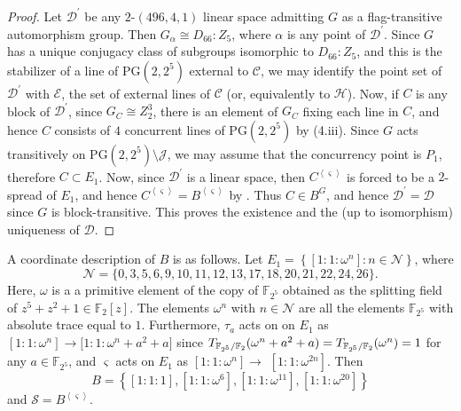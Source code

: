\documentclass[a4paper,twopage,reqno,12pt]{amsart}
\theoremstyle{definition}
\numberwithin{equation}{section}
\newcommand{\PG}{\mathrm{PG}}
\begin{document}
\begin{proof}
Let $\mathcal{D}^{\prime}$ be any $2$-$(496,4,1)$ linear space admitting $G$ as a flag-transitive automorphism group. Then $G_{\alpha} \cong D_{66}:Z_{5}$, where $\alpha$ is any point of $\mathcal{D}^{\prime}$. Since $G$ has a unique conjugacy class of subgroups isomorphic to $D_{66}:Z_{5}$, and this is the stabilizer of a line of $\PG(2,2^{5})$ external to $\mathcal{C}$, we may identify the point set of $\mathcal{D}^{\prime}$ with $\mathcal{E}$, the set of external lines of $\mathcal{C}$ (or, equivalently to $\mathcal{H}$). Now, if $C$ is any block of $\mathcal{D}^{\prime}$, since $G_{C}\cong Z^{3}_{2}$, there is an element of $G_{C}$ fixing each line in $C$, and hence $C$ consists of $4$ concurrent lines of $\PG(2,2^{5})$ by (4.iii). Since $G$ acts transitively on $\PG(2,2^{5})\setminus \mathcal{J}$, we may assume that the concurrency point is $P_{1}$, therefore $C \subset E_{1}$. Now, since $\mathcal{D}^{\prime}$ is a linear space, then $C^{\left\langle \varsigma \right\rangle}$ is forced to be a $2$-spread of $E_{1}$, and hence $C^{\left\langle \varsigma \right\rangle}=B^{\left\langle \varsigma \right\rangle}$ by \cite[Lemma 2.1]{Dru}. Thus $C \in B^{G}$, and hence $\mathcal{D}^{\prime}=\mathcal{D}$ since $G$ is block-transitive. This proves the existence and the (up to isomorphism) uniqueness of $\mathcal{D}$.
\end{proof}

\bigskip

A coordinate description of $B$ is as follows. Let $E_{1}=\left\{\left[1:1:\omega ^{n}\right]:n\in \mathcal{N}\right\}$, where 
\[
\mathcal{N}=\{0,3,5,6,9,10,11,12,13,17,18,20,21,22,24,26\}\text{.}
\]%
Here, $\omega $ is a a primitive element of the copy of $\mathbb{F}_{2^{5}}$ obtained as the
splitting field of $z^{5}+z^{2}+1\in \mathbb{F}_{2}[z]$. The elements $\omega ^{n}$
with $n\in \mathcal{N}$ are all the elements $\mathbb{F}_{2^{5}}$ with
absolute trace equal to $1$. Furthermore, $\tau _{a}$ acts on on $E_{1}$ as 
$[1:1:\omega ^{n}]\rightarrow \lbrack 1:1:\omega ^{n}+a^{2}+a]$ since $T_{%
\mathbb{F}_{2^{5}}/\mathbb{F}_{2}}(\omega ^{n}+a^{2}+a)=T_{\mathbb{F}%
_{2^{5}}/\mathbb{F}_{2}}(\omega ^{n})=1$ for any $a \in \mathbb{F}_{2^{5}}$, and $\varsigma $ acts on $E_{1}$
as $[1:1:\omega ^{n}]\rightarrow $ $[1:1:\omega ^{2n}]$. Then%
\[
B=\left\{ \left[1:1:1\right], \left[1:1:\omega^{6}\right], \left[1:1:\omega^{11}\right],\left[1:1:\omega^{20}\right]\right\} 
\]%
and $\mathcal{S}=B^{\left\langle \varsigma \right\rangle} $.

\bigskip 
\end{document}

